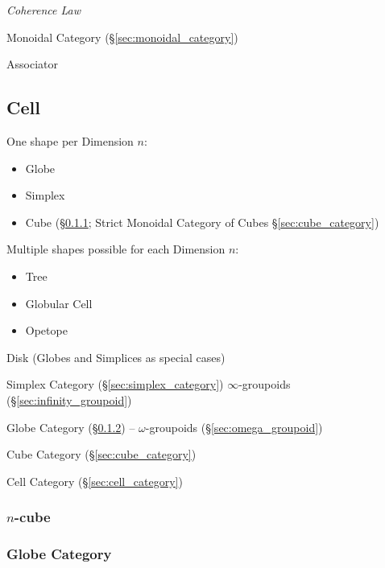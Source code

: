 \emph{Coherence Law}

Monoidal Category (\S\ref{sec:monoidal_category})

Associator



\subsection{Cell}\label{sec:cell}

One shape per Dimension $n$:
\begin{itemize}
  \item Globe
  \item Simplex
  \item Cube (\S\ref{sec:cellular_n_cube}; \fist Strict Monoidal Category of
    Cubes \S\ref{sec:cube_category})
\end{itemize}

Multiple shapes possible for each Dimension $n$:
\begin{itemize}
  \item Tree
  \item Globular Cell
  \item Opetope
\end{itemize}

Disk (Globes and Simplices as special cases)

\fist Simplex Category (\S\ref{sec:simplex_category})
$\infty$-groupoids (\S\ref{sec:infinity_groupoid})

\fist Globe Category (\S\ref{sec:globe_category}) --
$\omega$-groupoids (\S\ref{sec:omega_groupoid})

\fist Cube Category (\S\ref{sec:cube_category})

\fist Cell Category (\S\ref{sec:cell_category})



\subsubsection{$n$-cube}\label{sec:cellular_n_cube}

\subsubsection{Globe Category}\label{sec:globe_category}


